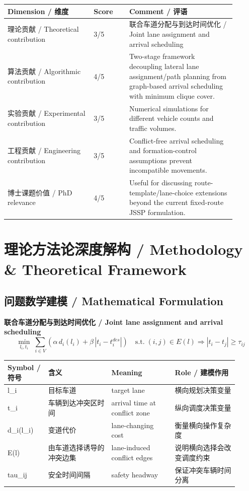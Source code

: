 \documentclass[UTF8,a4paper,11pt,fontset=fandol]{ctexart}
\begin{document}
\begin{longtable}{p{0.34\linewidth}p{0.14\linewidth}p{0.42\linewidth}}
\toprule
Dimension / 维度 & Score & Comment / 评语\\
\midrule
理论贡献 / Theoretical contribution & 3/5 & 联合车道分配与到达时间优化 / Joint lane assignment and arrival scheduling \\
算法贡献 / Algorithmic contribution & 4/5 & Two-stage framework decoupling lateral lane assignment/path planning from graph-based arrival scheduling with minimum clique cover. \\
实验贡献 / Experimental contribution & 3/5 & Numerical simulations for different vehicle counts and traffic volumes. \\
工程贡献 / Engineering contribution & 3/5 & Conflict-free arrival scheduling and formation-control assumptions prevent incompatible movements. \\
博士课题价值 / PhD relevance & 4/5 & Useful for discussing route-template/lane-choice extensions beyond the current fixed-route JSSP formulation. \\
\bottomrule
\end{longtable}

\section{理论方法论深度解构 / Methodology \& Theoretical Framework}
\subsection{问题数学建模 / Mathematical Formulation}
\textbf{联合车道分配与到达时间优化 / Joint lane assignment and arrival scheduling}
\[
\min_{l_i,t_i}\; \sum_{i\in V}\left(\alpha\,d_i(l_i)+\beta\,|t_i-t_i^{des}|\right)\quad \text{s.t.}\; (i,j)\in E(l)\Rightarrow |t_i-t_j|\ge \tau_{ij}
\]
\begin{longtable}{p{0.16\linewidth}p{0.25\linewidth}p{0.25\linewidth}p{0.25\linewidth}}
\toprule
Symbol / 符号 & 含义 & Meaning & Role / 建模作用\\
\midrule
l\_i & 目标车道 & target lane & 横向规划决策变量 \\
t\_i & 车辆到达冲突区时间 & arrival time at conflict zone & 纵向调度决策变量 \\
d\_i(l\_i) & 变道代价 & lane-changing cost & 衡量横向操作复杂度 \\
E(l) & 由车道选择诱导的冲突边集 & lane-induced conflict edges & 说明横向选择会改变调度约束 \\
tau\_ij & 安全时间间隔 & safety headway & 保证冲突车辆时间分离 \\
\bottomrule
\end{longtable}
\end{document}
